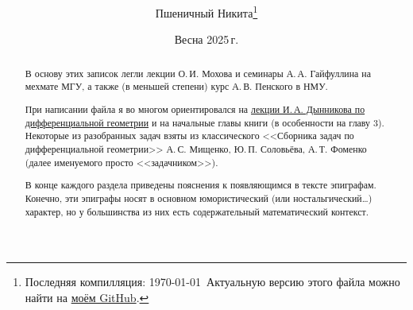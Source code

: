 \documentclass[a4paper, twoside, leqno, 11pt]{article}
\begin{document}
\title{\bfseries\scshape\course}
\date{Весна 2025\,г.}
\author{Пшеничный Никита\thanks{Последняя компилляция: \today\ Актуальную версию этого файла можно найти на \href{https://github.com/pshenikita/Differential-Geometry}{моём GitHub}.}}

\maketitle
\begin{abstract}
	В основу этих записок легли лекции О.\,И. Мохова и семинары А.\,А. Гайфуллина на мехмате МГУ, а также (в меньшей степени) курс А.\,В. Пенского в НМУ.

	При написании файла я во многом ориентировался на \href{https://teach-in.ru/course/classical-difgeom-dynnikov}{лекции И.\,А. Дынникова по дифференциальной геометрии} и на начальные главы книги \cite{NT14} (в особенности на главу 3). Некоторые из разобранных задач взяты из классического <<Сборника задач по дифференциальной геометрии>> А.\,С. Мищенко, Ю.\,П. Соловьёва, А.\,Т. Фоменко (далее именуемого просто <<задачником>>).

	В конце каждого раздела приведены пояснения к появляющимся в тексте эпиграфам. Конечно, эти эпиграфы носят в основном юмористический (или ностальгический\ldots) характер, но у большинства из них есть содержательный математический контекст.

	
\end{abstract}

\tableofcontents







%
\end{document}
